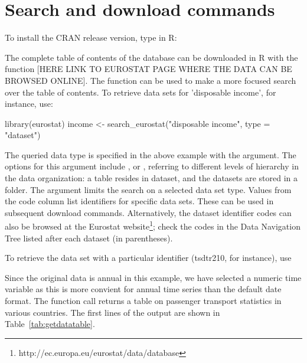 \section{Search and download commands}

To install the CRAN release version, type in R:


The complete table of contents of the database can be downloaded in R
with the function  [HERE LINK TO EUROSTAT
PAGE WHERE THE DATA CAN BE BROWSED ONLINE]. The
function  can be used to make a more focused
search over the table of contents. To retrieve data sets for
'disposable income', for instance, use:

\begin{example}
library(eurostat)
income <- search_eurostat("disposable income", type = "dataset")
\end{example}


The queried data type is specified in the above example with
the  argument. The options for this argument
include ,  or , referring to
different levels of hierarchy in the data organization: a table
resides in dataset, and the datasets are stored in a
folder. The  argument limits the search on a selected data
set type. Values from the code column list identifiers for specific
data sets. These can be used in subsequent download
commands. Alternatively, the dataset identifier codes can also be
browsed at the Eurostat
website\footnote{http://ec.europa.eu/eurostat/data/database}; check
the codes in the Data Navigation Tree listed after each dataset (in
parentheses).

To retrieve the data set with a particular identifier (tsdtr210, for
instance), use


Since the original data is annual in this example, we have selected a
numeric time variable as this is more convient for annual time series
than the default date format. The function call returns a table on
passenger transport statistics in various countries. The first lines
of the output are shown in Table~\ref{tab:getdatatable}.

